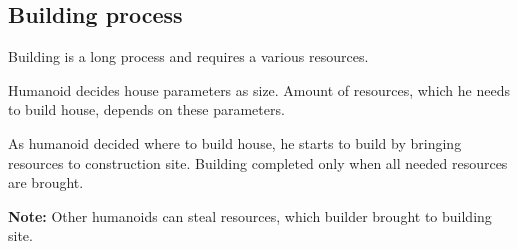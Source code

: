 \documentclass[12pt]{article}
\newcommand{\note}[1]{\textbf{\color{blue}Note:} #1}
\begin{document}
            \subsection{Building process}
                Building is a long process and requires a various resources.

                Humanoid decides house parameters as size. Amount of resources, which he needs to build house, depends on these parameters.

                As humanoid decided where to build house, he starts to build by bringing resources to construction site. Building completed only when all needed resources are brought.

                \note{Other humanoids can steal resources, which builder brought to building site.}
\end{document}
